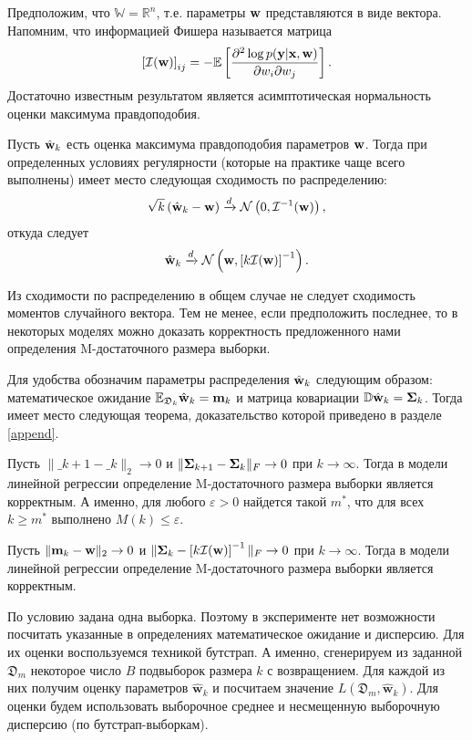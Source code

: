 Предположим, что $\mathbb{W} = \mathbb{R}^n$, т.е. параметры $\mathbf{w}$ представляются в виде вектора. Напомним, что информацией Фишера называется матрица
\[ \left[\mathcal{I}(\mathbf{w})\right]_{ij} = - \mathbb{E}\left[ \dfrac{\partial^2 \log p(\mathbf{y} | \mathbf{x}, \mathbf{w})}{\partial w_i \partial w_j} \right]. \]
Достаточно известным результатом является асимптотическая нормальность оценки максимума правдоподобия. 

\begin{proposition}
    Пусть $\hat{\mathbf{w}}_k$ есть оценка максимума правдоподобия параметров $\mathbf{w}$. Тогда при определенных условиях регулярности (которые на практике чаще всего выполнены) имеет место следующая сходимость по распределению:
    \[ \sqrt{k}\left( \hat{\mathbf{w}}_k - \mathbf{w} \right) \xrightarrow{d} \mathcal{N}\left(0, \mathcal{I}^{-1}(\mathbf{w})\right), \]
    откуда следует
    \[ \hat{\mathbf{w}}_k \xrightarrow{d} \mathcal{N}\left(\mathbf{w}, \left[k\mathcal{I}(\mathbf{w})\right]^{-1}\right). \]
\end{proposition}

Из сходимости по распределению в общем случае не следует сходимость моментов случайного вектора. Тем не менее, если предположить последнее, то в некоторых моделях можно доказать корректность предложенного нами определения M-достаточного размера выборки.

Для удобства обозначим параметры распределения $\hat{\mathbf{w}}_k$ следующим образом: математическое ожидание $\mathbb{E}_{\mathfrak{D}_k}\hat{\mathbf{w}}_k = \mathbf{m}_k$ и матрица ковариации $\mathbb{D}\hat{\mathbf{w}}_k = \boldsymbol{\Sigma}_k$. Тогда имеет место следующая теорема, доказательство которой приведено в разделе \ref{append}.

\begin{theorem}[Киселев, 2023]\label{theorem1}
    Пусть $\| \bm_{k+1} - \bm_k \|_2 \to 0$ и $\| \boldsymbol{\Sigma}_{k+1} - \boldsymbol{\Sigma}_k \|_{F} \to 0$ при $k \to \infty$. Тогда в модели линейной регрессии определение M-достаточного размера выборки является корректным. А именно, для любого $\varepsilon > 0$ найдется такой $m^*$, что для всех $k \geqslant m^*$ выполнено $M(k) \leqslant \varepsilon$.
\end{theorem}

\begin{corollary}
    Пусть $\| \mathbf{m}_k - \mathbf{w} \|_2 \to 0$ и $\| \boldsymbol{\Sigma}_k - \left[k\mathcal{I}(\mathbf{w})\right]^{-1} \|_{F} \to 0$ при $k \to \infty$. Тогда в модели линейной регрессии определение M-достаточного размера выборки является корректным. 
\end{corollary}

По условию задана одна выборка. Поэтому в эксперименте нет возможности посчитать указанные в определениях математическое ожидание и дисперсию. Для их оценки воспользуемся техникой бутстрап. А именно, сгенерируем из заданной $\mathfrak{D}_m$ некоторое число $B$ подвыборок размера $k$ с возвращением. Для каждой из них получим оценку параметров $\hat{\mathbf{w}}_{k}$ и посчитаем значение $L(\mathfrak{D}_m, \hat{\mathbf{w}}_{k})$. Для оценки будем использовать выборочное среднее и несмещенную выборочную дисперсию (по бутстрап-выборкам).

